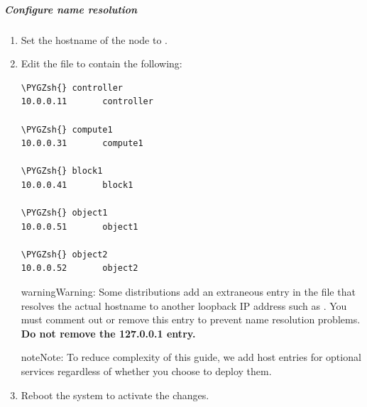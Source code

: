 \documentclass[letterpaper,10pt,english]{sphinxmanual}
\def\PYGZsh{\char`\#}
\begin{document}
\subparagraph{Configure name resolution}
\label{_source/installation_guide/environment-networking-storage-swift:id2}\begin{enumerate}
\item {} 
Set the hostname of the node to .

\item {} 
Edit the  file to contain the following:

\begin{Verbatim}[commandchars=\\\{\}]
\PYGZsh{} controller
10.0.0.11       controller

\PYGZsh{} compute1
10.0.0.31       compute1

\PYGZsh{} block1
10.0.0.41       block1

\PYGZsh{} object1
10.0.0.51       object1

\PYGZsh{} object2
10.0.0.52       object2
\end{Verbatim}

\begin{notice}{warning}{Warning:}
Some distributions add an extraneous entry in the 
file that resolves the actual hostname to another loopback IP
address such as . You must comment out or remove this
entry to prevent name resolution problems. \textbf{Do not remove the
127.0.0.1 entry.}
\end{notice}

\begin{notice}{note}{Note:}
To reduce complexity of this guide, we add host entries for optional
services regardless of whether you choose to deploy them.
\end{notice}

\item {} 
Reboot the system to activate the changes.

\end{enumerate}
\end{document}

